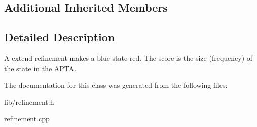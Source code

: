 \subsection*{Additional Inherited Members}


\subsection{Detailed Description}
A extend-\/refinement makes a blue state red. The score is the size (frequency) of the state in the A\+P\+TA. 

The documentation for this class was generated from the following files\+:\begin{DoxyCompactItemize}
\item 
lib/refinement.\+h\item 
refinement.\+cpp\end{DoxyCompactItemize}
